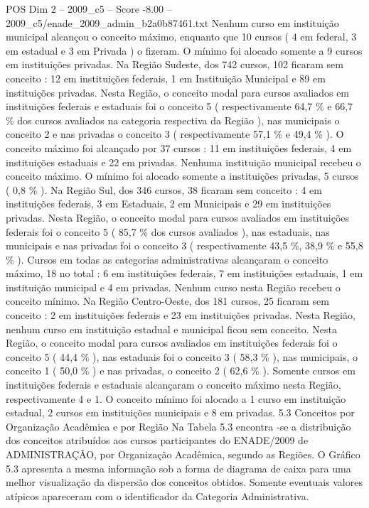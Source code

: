 \begin{textsample}{POS Dim 2 – 2009\_c5 – Score -8.00 – 2009\_c5/enade\_2009\_admin\_b2a0b87461.txt}
Nenhum curso em instituição municipal alcançou o conceito máximo, enquanto que 10 cursos ( 4 em federal, 3 em estadual e 3 em Privada ) o fizeram.
O mínimo foi alocado somente a 9 cursos em instituições privadas.
Na Região Sudeste, dos 742 cursos, 102 ficaram sem conceito : 12 em instituições federais, 1 em Instituição Municipal e 89 em instituições privadas.
Nesta Região, o conceito modal para cursos avaliados em instituições federais e estaduais foi o conceito 5 ( respectivamente 64,7 \% e 66,7 \% dos cursos avaliados na categoria respectiva da Região ), nas municipais o conceito 2 e nas privadas o conceito 3 ( respectivamente 57,1 \% e 49,4 \% ).
O conceito máximo foi alcançado por 37 cursos : 11 em instituições federais, 4 em instituições estaduais e 22 em privadas.
Nenhuma instituição municipal recebeu o conceito máximo.
O mínimo foi alocado somente a instituições privadas, 5 cursos ( 0,8 \% ).
Na Região Sul, dos 346 cursos, 38 ficaram sem conceito : 4 em instituições federais, 3 em Estaduais, 2 em Municipais e 29 em instituições privadas.
Nesta Região, o conceito modal para cursos avaliados em instituições federais foi o conceito 5 ( 85,7 \% dos cursos avaliados ), nas estaduais, nas municipais e nas privadas foi o conceito 3 ( respectivamente 43,5 \%, 38,9 \% e 55,8 \% ).
Cursos em todas as categorias administrativas alcançaram o conceito máximo, 18 no total : 6 em instituições federais, 7 em instituições estaduais, 1 em instituição municipal e 4 em privadas.
Nenhum curso nesta Região recebeu o conceito mínimo.
Na Região Centro-Oeste, dos 181 cursos, 25 ficaram sem conceito : 2 em instituições federais e 23 em instituições privadas.
Nesta Região, nenhum curso em instituição estadual e municipal ficou sem conceito.
Nesta Região, o conceito modal para cursos avaliados em instituições federais foi o conceito 5 ( 44,4 \% ), nas estaduais foi o conceito 3 ( 58,3 \% ), nas municipais, o conceito 1 ( 50,0 \% ) e nas privadas, o conceito 2 ( 62,6 \% ).
Somente cursos em instituições federais e estaduais alcançaram o conceito máximo nesta Região, respectivamente 4 e 1.
O conceito mínimo foi alocado a 1 curso em instituição estadual, 2 cursos em instituições municipais e 8 em privadas. 5.3 Conceitos por Organização Acadêmica e por Região Na Tabela 5.3 encontra -se a distribuição dos conceitos atribuídos aos cursos participantes do ENADE/2009 de ADMINISTRAÇÃO, por Organização Acadêmica, segundo as Regiões.
O Gráfico 5.3 apresenta a mesma informação sob a forma de diagrama de caixa para uma melhor visualização da dispersão dos conceitos obtidos.
Somente eventuais valores atípicos apareceram com o identificador da Categoria Administrativa.

\end{textsample}
